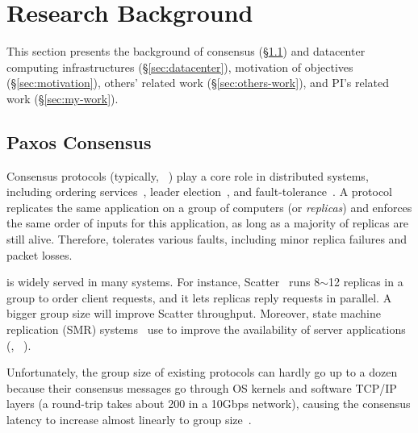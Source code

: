 \vspace{-.15in}\section{Research Background} 
\label{sec:background}\vspace{-.075in}

This section presents the background of consensus (\S\ref{sec:consensus}) and 
datacenter computing infrastructures (\S\ref{sec:datacenter}), motivation of 
objectives (\S\ref{sec:motivation}), others' related work 
(\S\ref{sec:others-work}), and PI's related work (\S\ref{sec:my-work}).

\vspace{-.15in}\subsection{Paxos Consensus} 
\label{sec:consensus}\vspace{-.075in}

Consensus protocols (typically, 
\paxos~\cite{paxos:practical,paxos,paxos:simple,paxos:complex}) play a 
core role in distributed systems, including ordering 
services~\cite{ellis:thesis,manos:hotdep10,scatter:sosp11},
leader election~\cite{zookeeper, chubby:osdi}, and
fault-tolerance~\cite{eve:osdi12,rex:eurosys14,crane:sosp15}. A \paxos protocol
replicates the same application on a group of computers (or \emph{replicas}) 
and enforces the same order of inputs for this application, as long as 
a majority of replicas are still alive. Therefore, \paxos tolerates 
various faults, including minor replica failures and packet losses.

\paxos is widely served in many systems. For instance, 
Scatter~\cite{scatter:sosp11} runs 8$\sim$12 replicas in a
\paxos group to order client requests, and it lets replicas reply requests
in parallel. A bigger group size will improve Scatter throughput. 
Moreover, state machine replication (SMR) 
systems~\cite{eve:osdi12,rex:eurosys14,crane:sosp15} use \paxos to 
improve the availability of server applications (\eg, \mysql~\cite{mysql}).

Unfortunately, the group size of existing \paxos protocols can hardly go up 
to a dozen because their consensus messages go through OS kernels and software 
TCP/IP layers (a  round-trip takes about 200 \us in a 10Gbps network), 
causing the consensus latency to increase almost linearly to 
group size~\cite{scatter:sosp11,zookeeper,crane:sosp15}.

